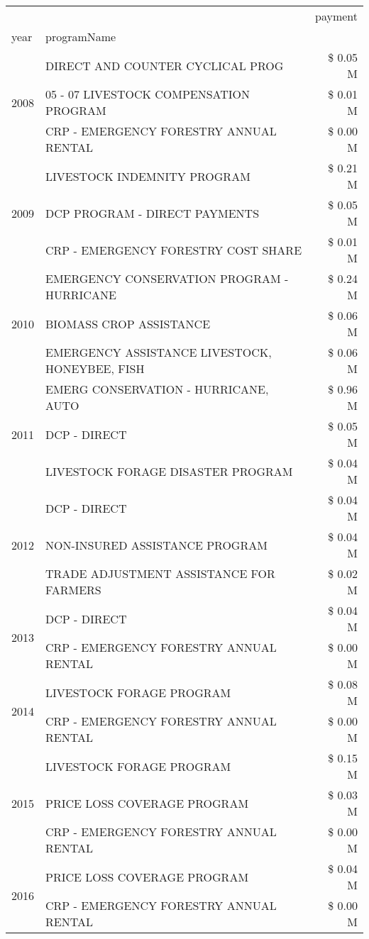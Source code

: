 \begin{tabular}{llr}
\toprule
 &  & payment \\
year & programName &  \\
\midrule
\multirow[t]{3}{*}{2008} & DIRECT AND COUNTER CYCLICAL PROG & \$ 0.05 M \\
 & 05 - 07 LIVESTOCK COMPENSATION PROGRAM & \$ 0.01 M \\
 & CRP - EMERGENCY FORESTRY ANNUAL RENTAL & \$ 0.00 M \\
\cline{1-3}
\multirow[t]{3}{*}{2009} & LIVESTOCK INDEMNITY PROGRAM & \$ 0.21 M \\
 & DCP PROGRAM - DIRECT PAYMENTS & \$ 0.05 M \\
 & CRP - EMERGENCY FORESTRY COST SHARE & \$ 0.01 M \\
\cline{1-3}
\multirow[t]{3}{*}{2010} & EMERGENCY CONSERVATION PROGRAM - HURRICANE & \$ 0.24 M \\
 & BIOMASS CROP ASSISTANCE & \$ 0.06 M \\
 & EMERGENCY ASSISTANCE LIVESTOCK, HONEYBEE, FISH & \$ 0.06 M \\
\cline{1-3}
\multirow[t]{3}{*}{2011} & EMERG CONSERVATION - HURRICANE, AUTO & \$ 0.96 M \\
 & DCP - DIRECT & \$ 0.05 M \\
 & LIVESTOCK FORAGE DISASTER PROGRAM & \$ 0.04 M \\
\cline{1-3}
\multirow[t]{3}{*}{2012} & DCP - DIRECT & \$ 0.04 M \\
 & NON-INSURED ASSISTANCE PROGRAM & \$ 0.04 M \\
 & TRADE ADJUSTMENT ASSISTANCE FOR FARMERS & \$ 0.02 M \\
\cline{1-3}
\multirow[t]{2}{*}{2013} & DCP - DIRECT & \$ 0.04 M \\
 & CRP - EMERGENCY FORESTRY ANNUAL RENTAL & \$ 0.00 M \\
\cline{1-3}
\multirow[t]{2}{*}{2014} & LIVESTOCK FORAGE PROGRAM & \$ 0.08 M \\
 & CRP - EMERGENCY FORESTRY ANNUAL RENTAL & \$ 0.00 M \\
\cline{1-3}
\multirow[t]{3}{*}{2015} & LIVESTOCK FORAGE PROGRAM & \$ 0.15 M \\
 & PRICE LOSS COVERAGE PROGRAM & \$ 0.03 M \\
 & CRP - EMERGENCY FORESTRY ANNUAL RENTAL & \$ 0.00 M \\
\cline{1-3}
\multirow[t]{2}{*}{2016} & PRICE LOSS COVERAGE PROGRAM & \$ 0.04 M \\
 & CRP - EMERGENCY FORESTRY ANNUAL RENTAL & \$ 0.00 M \\

\end{tabular}
